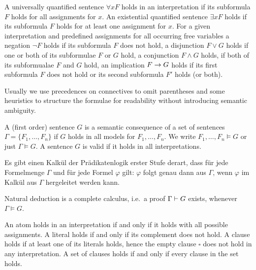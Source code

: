 \begin{definition}\label{def:semantics:FOF}
	A universally quantified sentence $\forall x F$
	holds in an interpretation if its subformula $F$ holds for all assignments for $x$.
	An existential quantified sentence $\exists xF$ holds if its subformula $F$ holds for at least one assignment for $x$.
	For a given interpretation and predefined assignments for all occurring free variables
	a negation $\lnot F$ holds if its subformula $F$ does not hold,
	a disjunction $F\lor G$ holds if one or both of its subformulae $F$ or $G$ hold,
	a conjunction $F\land G$ holds, if both of its subformualae $F$ and $G$ hold,
	an implication $F\rightarrow G$ holds if its first subformula $F$ does not hold or its second subformula $F'$ holds (or both).

	\begin{remark}Usually we use precedences on connectives to omit parentheses
		and some heuristics to structure the formulae for readability
		without introducing semantic ambiguity.
	\end{remark}
\end{definition}

\begin{definition}
	A (first order) sentence $G$ is a semantic consequence of a set of sentences
	$\Gamma = \{ F_1,\ldots,F_n \}$ if $G$ holds in all models for $F_1,\ldots,F_n$.
	We write $F_1,\ldots,F_n\models G$ or just $\Gamma\models G$.
	A sentence $G$ is valid if it holds in all interpretations.
\end{definition}

\begin{theorem}
	Es gibt einen Kalkül der Prädikatenlogik erster Stufe derart, dass für jede Formelmenge
$\Gamma$ und für jede Formel
$\varphi$ gilt:
$\varphi$ folgt genau dann aus
$\Gamma$, wenn
$\varphi$ im Kalkül aus
$\Gamma$  hergeleitet werden kann.
\end{theorem}

\begin{theorem}
	Natural deduction is a complete calculus, i.e.~a proof $\Gamma\vdash G$ exists,
	whenever $\Gamma\models G$.
\end{theorem}

\begin{definition}\label{def:semantics:CNF}
	An atom holds in an interpretation if and only if it
	holds with all possible assignments.
	A literal holds if and only if its complement does not hold.
	A clause holds if at least one of its literals holds,
	hence the empty clause $\square$ does not hold in any interpretation.
	A set of clauses holds if and only if every clause in the set holds.
\end{definition}

